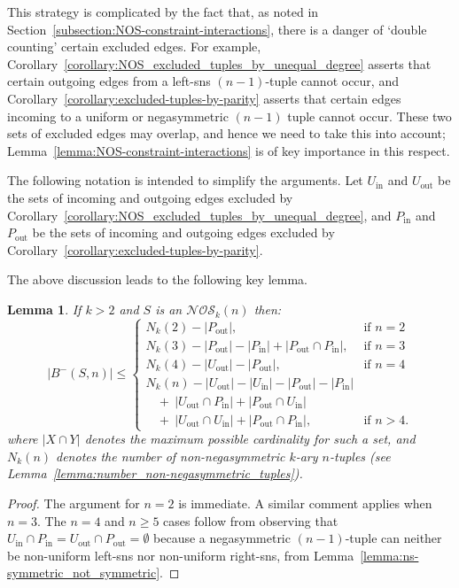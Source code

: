 \documentclass[a4paper,11pt]{article}
\theoremstyle{plain}
\newtheorem{lemma}{Lemma}[section]
\theoremstyle{definition}
\theoremstyle{remark}
\begin{document}
This strategy is complicated by the fact that, as noted in
Section~\ref{subsection:NOS-constraint-interactions}, there is a danger of `double counting'
certain excluded edges.  For example,
Corollary~\ref{corollary:NOS_excluded_tuples_by_unequal_degree} asserts that certain outgoing edges
from a left-sns $(n-1)$-tuple cannot occur, and Corollary~\ref{corollary:excluded-tuples-by-parity}
asserts that certain edges incoming to a uniform or negasymmetric $(n-1)$ tuple cannot occur. These
two sets of excluded edges may overlap, and hence we need to take this into account;
Lemma~\ref{lemma:NOS-constraint-interactions} is of key importance in this respect.

The following notation is intended to simplify the arguments.  Let $U_{\text{in}}$ and
$U_{\text{out}}$ be the sets of incoming and outgoing edges excluded by
Corollary~\ref{corollary:NOS_excluded_tuples_by_unequal_degree}, and $P_{\text{in}}$ and
$P_{\text{out}}$ be the sets of incoming and outgoing edges excluded by
Corollary~\ref{corollary:excluded-tuples-by-parity}.

The above discussion leads to the following key lemma.

\begin{lemma}  \label{lemma:NOS-bounds-high-level}
If $k>2$ and $S$ is an $\mathcal{NOS}_k(n)$ then:
\[ |B^-(S,n)|\leq \begin{cases}
N_k(2) - |P_{\text{out}}|,
 & \text{if $n=2$} \\
N_k(3) - |P_{\text{out}}|-|P_{\text{in}}| + |P_{\text{out}}\cap P_{\text{in}}|,
 & \text{if $n=3$} \\
N_k(4) - |U_{\text{out}}|-|P_{\text{out}}|,
 & \text{if $n=4$} \\
N_k(n) - |U_{\text{out}}|-|U_{\text{in}}|-|P_{\text{out}}|-|P_{\text{in}}| \\
~~~~+~|U_{\text{out}}\cap P_{\text{in}}|+|P_{\text{out}}\cap U_{\text{in}}| \\
~~~~+~|U_{\text{out}}\cap U_{\text{in}}|+|P_{\text{out}}\cap P_{\text{in}}|,
 & \text{if $n>4$.}
\end{cases} \]
where $|X\cap Y|$ denotes the maximum possible cardinality for such a set, and $N_k(n)$ denotes the
number of non-negasymmetric $k$-ary $n$-tuples (see
Lemma~\ref{lemma:number_non-negasymmetric_tuples}).
\end{lemma}

\begin{proof}
The argument for $n=2$ is immediate. A similar comment applies when $n=3$.  The $n=4$ and $n \ge 5$
cases follow from observing that $U_{\text{in}}\cap P_{\text{in}}=U_{\text{out}}\cap
P_{\text{out}}=\emptyset$ because a negasymmetric $(n-1)$-tuple can neither be non-uniform left-sns
nor non-uniform right-sns, from Lemma~\ref{lemma:ns-symmetric_not_symmetric}.
\end{proof}
\end{document}
